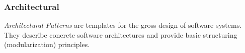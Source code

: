 %
%
%
%
%
%
%

\subsubsection{Architectural}
\label{architectural_heading}

\emph{Architectural Patterns} are templates for the gross design of software
systems. They describe concrete software architectures and provide basic
structuring (modularization) principles.










